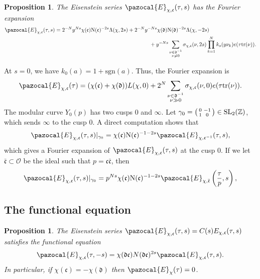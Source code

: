 \documentclass[twoside,a4paper,10pt]{article} %
\newcommand{\8}{\infty}
\newcommand{\Z}{\mathbb{Z}}
\newcommand{\SL}{\mathrm{SL}}
\newcommand{\dfrak}{\mathfrak{d}}
\newcommand{\cfrak}{\mathfrak{c}}
\newcommand{\tr}{\mathrm{tr}}
\newcommand{\N}{\mathrm{N}}
\newcommand{\sgn}{\mathrm{sgn}}
\newcommand{\Ocal}{\mathcal{O}}
\newcommand{\Ecal}{\pazocal{E}}
\theoremstyle{mytheoremstyle}
\newtheorem{prop}[thm]{Proposition}
\theoremstyle{remark}
\numberwithin{equation}{section}
\begin{document}
\begin{prop}\label{Fourier expansion s} The Eisenstein series $\Ecal_{\chi,\cfrak}(\tau,s)$ has the Fourier expansion
\begin{align}
\Ecal_{\chi,\cfrak}(\tau,s) =2^{-N}y^{Ns}\chi(\cfrak)\N(\cfrak)^{-2s}\Lambda(\chi,2s)&+2^{-N}y^{-Ns}\chi(\dfrak)\N(\dfrak)^{-2s}\Lambda(\chi,-2s) \\
&  \qquad \qquad +y^{-Ns}\sum_{\substack{\nu \in \dfrak^{-1}\\ \nu \neq 0}} \sigma_{\chi,\cfrak}(\nu,2s) \prod_{k=1}^N k_s(y \nu_k) e(\tau\tr(\nu)).
\end{align}
\end{prop}
At $s=0$, we have $k_0(a)=1+\sgn(a)$. Thus, the Fourier expansion is
\begin{align} \label{fourier expansion at zero}
\Ecal_{\chi,\cfrak}(\tau)=(\chi(\cfrak)+\chi(\dfrak))L(\chi,0)+ 2^{N}\sum_{\substack{\nu \in \dfrak^{-1}\\ \nu \gg 0}} \sigma_{\chi,\cfrak}(\nu,0)e(\tau \tr(\nu)).
\end{align}
The modular curve $Y_0(p)$ has two cusps $0$ and $\8$. Let $\gamma_0=\begin{psmallmatrix}0 & -1 \\ 1 & 0	\end{psmallmatrix} \in \SL_2(\Z)$, which sends $\8$ to the cusp $0$.  A direct computation shows that
\begin{align}
\Ecal_{\chi,\cfrak}(\tau,s) \vert_{\gamma_0}=\chi(\cfrak)\N(\cfrak)^{-1-2s}\Ecal_{\chi,\cfrak^{-1}}(\tau,s),
\end{align}
which gives a Fourier expansion of $\Ecal_{\chi,\cfrak}(\tau,s)$ at the cusp $0$. If we let $\bar{\cfrak} \subset \Ocal$ be the ideal such that $p=\cfrak\bar{\cfrak}$, then
\begin{align}
\Ecal_{\chi,\cfrak}(\tau,s) \vert_{\gamma_0}=p^{Ns}\chi(\cfrak)\N(\cfrak)^{-1-2s}\Ecal_{\chi,\bar{\cfrak}}\left (\frac{\tau}{p},s \right ),
\end{align}










\subsection{The functional equation}

\begin{prop}
The Eisenstein series $\Ecal_{\chi,\cfrak}(\tau,s) = C(s) E_{\chi,\cfrak}(\tau,s)$ satisfies the functional equation
\begin{align}
\Ecal_{\chi,\cfrak}(\tau,-s)=\chi(\dfrak\cfrak)N(\dfrak\cfrak)^{2s}\Ecal_{\chi,\cfrak}(\tau,s).
\end{align}
In particular, if $\chi(\cfrak)=-\chi(\dfrak)$ then $\Ecal_{\chi}(\tau)=0$.
\end{prop}
\end{document}
